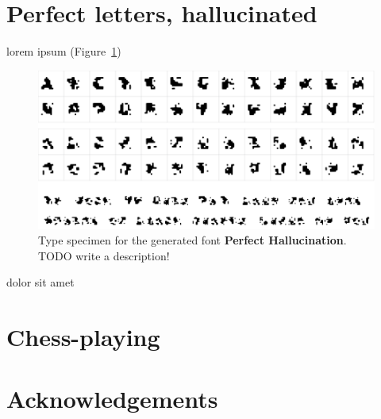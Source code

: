 \documentclass[twocolumn]{article} %
\begin{document}




%

\section{Perfect letters, hallucinated} \label{sec:hallucination}


lorem ipsum (Figure~\ref{fig:perfect})


\begin{figure}[tp]
\centering
  \includegraphics[width=0.9 \linewidth]{perfecthallucination}
\caption{
   Type specimen for the generated font {\bf Perfect Hallucination}.
  TODO write a description!
} \label{fig:perfect}
\end{figure}



dolor sit amet

\section{Chess-playing}






\section{Acknowledgements}
\end{document}

